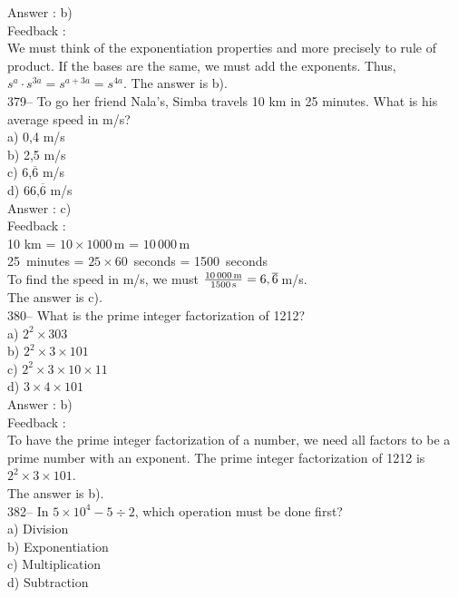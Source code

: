 \documentclass[letterpaper, 12pt]{article}
\begin{document}
Answer : b)\\

Feedback : \\
We must think of the exponentiation properties and more precisely to rule of product. If the bases are the same, we must add the exponents. Thus, $s^{a}\cdot s^{3a}=s^{a+3a}=s^{4a}$. The answer is b).\\

379-- To go her friend Nala's, Simba travels 10 km in 25 minutes.
  What is his average speed in m/s?\\
a) 0,4 m/s\\
b) 2,5 m/s\\
c) 6,$\overline{6}$ m/s\\
d) 66,$\overline{6}$ m/s\\

Answer : c)\\

Feedback : \\
10 km = $10\times1000$\,m = $10\,000$\,m\\
25~minutes = $25\times60$~seconds = 1500~seconds\\
To find the speed in m/s, we must
$\frac{10\,000\textrm{\,m}}{1500\textrm{\,s}}=6,\overline{6}$\,m/s.\\
The answer is c).\\

380-- What is the prime integer factorization of 1212?\\
a) $2^{2}\times303$\\
b) $2^{2}\times3\times101$\\
c) $2^{2}\times3\times10\times11$\\
d) $3\times4\times101$\\


Answer : b)\\

Feedback : \\
To have the prime integer factorization of a number, we need all factors to be a prime number with an exponent. The prime integer factorization of 1212 is $2^{2}\times3\times101$.\\  The answer is b).\\


382-- In $5\times10^{4}-5\div2$, which operation must be done first?\\
a) Division\\
b) Exponentiation\\
c) Multiplication\\
d) Subtraction\\
\end{document}
